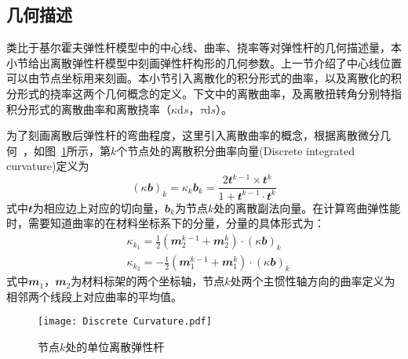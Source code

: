 \subsection{几何描述}
类比于基尔霍夫弹性杆模型中的中心线、曲率、挠率等对弹性杆的几何描述量，本小节给出离散弹性杆模型中刻画弹性杆构形的几何参数。上一节介绍了中心线位置可以由节点坐标用来刻画。本小节引入离散化的积分形式的曲率，以及离散化的积分形式的挠率这两个几何概念的定义。下文中的离散曲率，及离散扭转角分别特指积分形式的离散曲率和离散挠率（$\kappa \mathrm{d}s$，$\tau \mathrm{d}s$）。

为了刻画离散后弹性杆的弯曲程度，这里引入离散曲率的概念，根据离散微分几何~\cite{bobenko2015geometry}，如图~\ref{fig:Discrete Curavature}所示，第$k$个节点处的离散积分曲率向量(Discrete integrated curvature)定义为
\begin{equation}
	(\kappa \mathbfit{b})_{k}=\kappa_{k} \mathbfit{b}_{k}=\frac{2 \mathbfit{t}^{k-1} \times \mathbfit{t}^{k}}{1+\mathbfit{t}^{k-1} \cdot \mathbfit{t}^{k}}
	\label{eq：Discrete Curvature}
\end{equation}
式中$\mathbfit{t}$为相应边上对应的切向量，$\mathbfit{b}_k$为节点$k$处的离散副法向量。在计算弯曲弹性能时，需要知道曲率的在材料坐标系下的分量，分量的具体形式\cite{bergou2008discrete}为：
\begin{equation}
	\begin{split}
		&\kappa_{k_{1}}  =\frac{1}{2}\left(\mathbfit{m}_{2}^{k-1}+\mathbfit{m}_{2}^{k}\right) \cdot(\kappa \mathbfit{b})_{k} \\
		& \kappa_{k_{2}} =-\frac{1}{2}\left(\mathbfit{m}_{1}^{k-1}+\mathbfit{m}_{1}^{k}\right) \cdot(\kappa \mathbfit{b})_{k}
		\end{split}
\end{equation}
式中$\mathbfit{m}_1$，$\mathbfit{m}_2$为材料标架的两个坐标轴，节点$k$处两个主惯性轴方向的曲率定义为相邻两个线段上对应曲率的平均值。
\begin{figure}
	\centering
	\texttt{[image: Discrete Curvature.pdf]}
	\caption{节点$k$处的单位离散弹性杆}
	\label{fig:Discrete Curavature}
\end{figure}

